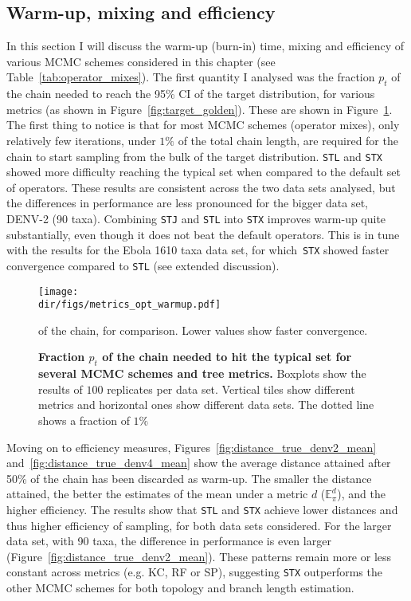 \subsection{Warm-up, mixing and efficiency}
\label{sec:mcmc_efficiency}

In this section I will discuss the warm-up (burn-in) time, mixing and efficiency of various MCMC schemes considered in this chapter (see Table~\ref{tab:operator_mixes}).
The first quantity I analysed was the fraction $p_t$ of the chain needed to reach the 95\% CI of the target distribution, for various metrics (as shown in Figure~\ref{fig:target_golden}).
These are shown in Figure~\ref{fig:fractions_metrics}.
The first thing to notice is that for most MCMC schemes (operator mixes), only relatively few iterations, under $1\%$ of the total chain length, are required for the chain to start sampling from the bulk of the target distribution.
\verb|STL| and \verb|STX| showed more difficulty reaching the typical set when compared to the default set of operators.
These results are consistent across the two data sets analysed, but the differences in performance are less pronounced for the bigger data set, DENV-2 (90 taxa).
Combining \verb|STJ| and \verb|STL| into \verb|STX| improves warm-up quite substantially, even though it does not beat the default operators.
This is in tune with the results for the Ebola 1610 taxa data set, for which~\verb|STX| showed faster convergence compared to \verb|STL| (see extended discussion).
\begin{figure}[!ht]
\begin{center}
\texttt{[image: \\dir/figs/metrics\_opt\_warmup.pdf]} 
\end{center}
 \caption[Fraction $p_t$ of the chain needed to hit the typical set for several MCMC schemes and tree metrics.]{\textbf{Fraction $p_t$ of the chain needed to hit the typical set for several MCMC schemes and tree metrics.}
  Boxplots show the results of $100$ replicates per data set.
  Vertical tiles show different metrics and horizontal ones show different data sets.
  The dotted line shows a fraction of $1\%$ 
  }
of the chain, for comparison.
  Lower values show faster convergence.
 \label{fig:fractions_metrics}
\end{figure}

Moving on to efficiency measures, Figures~\ref{fig:distance_true_denv2_mean} and~\ref{fig:distance_true_denv4_mean} show the average distance attained after 50\% of the chain has been discarded as warm-up.
The smaller the distance attained, the better the estimates of the mean under a metric $d$ ($\mathbb{E}_\pi^d$), and the higher efficiency.  
The results show that \verb|STL| and \verb|STX| achieve lower distances and thus higher efficiency of sampling, for both data sets considered.
For the larger data set, with 90 taxa, the difference in performance is even larger (Figure~\ref{fig:distance_true_denv2_mean}).
These patterns remain more or less constant across metrics (e.g. KC, RF or SP), suggesting \verb|STX| outperforms the other MCMC schemes for both topology and branch length estimation. 

